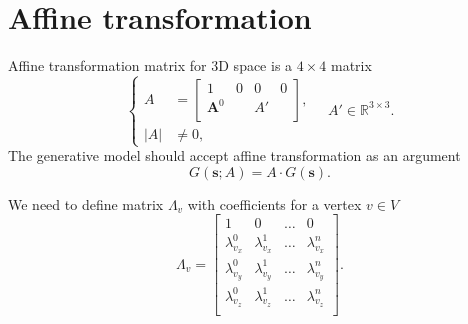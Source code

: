\section{Affine transformation}

Affine transformation matrix for 3D space is a $4 \times 4$ matrix
\cite{Geometry:2003}
\begin{equation}\label{eq:matrix:affine}
  \left\{\begin{aligned}
    A &= \begin{bmatrix}
      1         & 0 & 0  & 0 \\
      \pmb{A}^0 &   & A' &   \\
    \end{bmatrix}, \\
    \left| A \right| &\neq 0,
  \end{aligned}\right.
  \quad A' \in \mathbb{R}^{3 \times 3}.
\end{equation}
The generative model should accept affine transformation as an argument
\begin{equation*}
  G\left( \pmb{s}; A \right) = A \cdot G\left( \pmb{s} \right).
\end{equation*}

We need to define matrix $\Lambda_v$ with coefficients for
a vertex $v \in V$
\begin{equation*}
  \Lambda_v = \begin{bmatrix}
    1               & 0               & \dots & 0 \\
    \lambda^0_{v_x} & \lambda^1_{v_x} & \dots & \lambda^n_{v_x} \\
    \lambda^0_{v_y} & \lambda^1_{v_y} & \dots & \lambda^n_{v_y} \\
    \lambda^0_{v_z} & \lambda^1_{v_z} & \dots & \lambda^n_{v_z} \\
  \end{bmatrix}.
\end{equation*}

